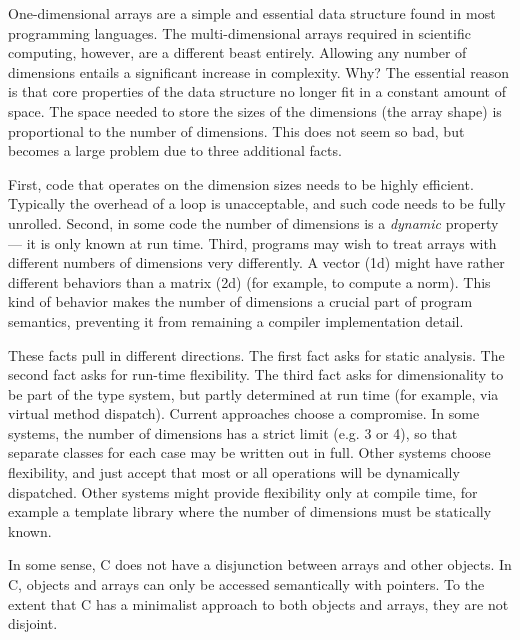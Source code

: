 \documentclass[preprint]{sigplanconf}
\begin{document}
One-dimensional arrays are a simple and essential data structure found in
most programming languages. The multi-dimensional arrays required in
scientific computing, however, are a different beast entirely. Allowing
any number of dimensions entails a significant increase in complexity. Why?
The essential reason is that core properties of the data structure no
longer fit in a constant amount of space. The space needed to store the
sizes of the dimensions (the array shape) is proportional to the number
of dimensions. This does not seem so bad, but becomes a large problem
due to three additional facts.

First, code that operates on the dimension
sizes needs to be highly efficient. Typically the overhead of a loop is
unacceptable, and such code needs to be fully unrolled. Second, in some
code the number of dimensions is a \emph{dynamic} property --- it is
only known at run time. Third, programs may wish to treat arrays with
different numbers of dimensions very differently. A vector (1d) might
have rather different behaviors than a matrix (2d) (for example, to
compute a norm). This kind of
behavior makes the number of dimensions a crucial part of program
semantics, preventing it from remaining a compiler implementation detail.


These facts pull in different directions. The first fact asks for static
analysis. The second fact asks for run-time flexibility. The third fact asks
for dimensionality to be part of the type system, but partly determined
at run time (for example, via virtual method dispatch). Current approaches
choose a compromise. In some systems, the number of dimensions has a strict
limit (e.g. 3 or 4), so that separate classes for each case may be written
out in full. Other systems choose flexibility, and just accept that most
or all operations will be dynamically dispatched. Other systems might
provide flexibility only at compile time, for example a template library
where the number of dimensions must be statically known.


In some sense, C does not have a disjunction between arrays and other objects. In C, objects and arrays can only be accessed semantically with pointers. To the extent that C has a minimalist approach to both objects and arrays, they are not disjoint.
\end{document}

